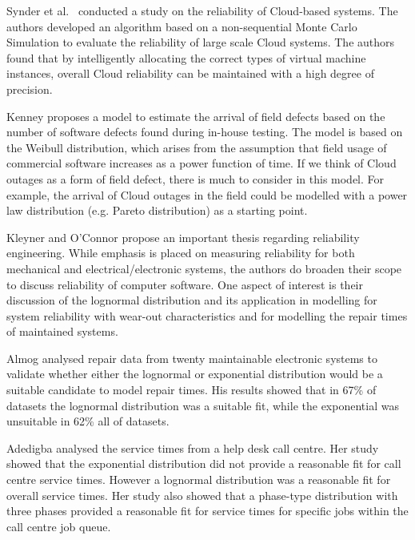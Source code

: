 \documentclass[5p]{elsarticle}
\begin{document}
Synder et al.~\cite{snyder2015evaluation} conducted a study on the reliability of Cloud-based systems. The authors developed an algorithm based on a non-sequential Monte Carlo Simulation to evaluate the reliability of large scale Cloud systems. The authors found that by intelligently allocating the correct types of virtual machine instances, overall Cloud reliability can be maintained with a high degree of precision. \par

Kenney \cite{kenny1993estimating} proposes a model to estimate the arrival of field defects based on the number of software defects found during in-house testing. The model is based on the Weibull distribution, which arises from the assumption that field usage of commercial software increases as a power function of time. If we think of Cloud outages as a form of field defect, there is much to consider in this model. For example, the arrival of Cloud outages in the field could be modelled with a power law distribution (e.g. Pareto distribution) as a starting point. \par 

Kleyner and O'Connor \cite{o2011practical} propose an important thesis regarding reliability engineering. While emphasis is placed on measuring reliability for both mechanical and electrical/electronic systems, the authors do broaden their scope to discuss reliability of computer software. One aspect of interest is their discussion of the lognormal distribution and its application in modelling for system reliability with wear-out characteristics and for modelling the repair times of maintained systems. \par

Almog \cite{almog1979study} analysed repair data from twenty maintainable electronic systems to validate whether either the lognormal or exponential distribution would be a suitable candidate to model repair times. His results showed that in 67\% of datasets the lognormal distribution was a suitable fit, while the exponential was unsuitable in 62\% all of datasets. \par

Adedigba \cite{adedigba2005statistical} analysed the service times from a help desk call centre. Her study showed that the exponential distribution did not provide a reasonable fit for call centre service times. However a lognormal distribution was a reasonable fit for overall service times. Her study also showed that a phase-type distribution with three phases provided a reasonable fit for service times for specific jobs within the call centre job queue. \par
\end{document}
